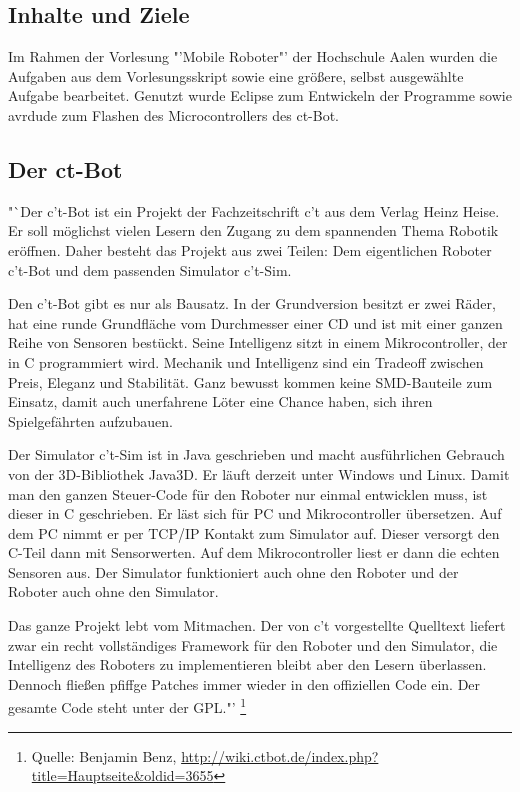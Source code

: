 \subsection{Inhalte und Ziele}
Im Rahmen der Vorlesung "'Mobile Roboter"' der Hochschule Aalen wurden die Aufgaben aus dem Vorlesungsskript sowie eine größere, selbst ausgewählte Aufgabe bearbeitet.
Genutzt wurde Eclipse zum Entwickeln der Programme sowie avrdude zum Flashen des Microcontrollers des ct-Bot.

\subsection{Der ct-Bot}
"`Der c't-Bot ist ein Projekt der Fachzeitschrift c't aus dem Verlag Heinz Heise.
Er soll möglichst vielen Lesern den Zugang zu dem spannenden Thema Robotik eröffnen.
Daher besteht das Projekt aus zwei Teilen: Dem eigentlichen Roboter c't-Bot und dem passenden Simulator c't-Sim.

Den c't-Bot gibt es nur als Bausatz. In der Grundversion besitzt er zwei Räder,
hat eine runde Grundfläche vom Durchmesser einer CD und ist mit einer ganzen Reihe von Sensoren
bestückt. Seine Intelligenz sitzt in einem Mikrocontroller, der in C programmiert wird. Mechanik
und Intelligenz sind ein Tradeoff zwischen Preis, Eleganz und Stabilität. Ganz bewusst kommen keine
SMD-Bauteile zum Einsatz, damit auch unerfahrene Löter eine Chance haben,
sich ihren Spielgefährten aufzubauen.

Der Simulator c't-Sim ist in Java geschrieben und macht ausführlichen Gebrauch von der
3D-Bibliothek Java3D. Er läuft derzeit unter Windows und Linux. Damit man den ganzen Steuer-Code
für den Roboter nur einmal entwicklen muss, ist dieser in C geschrieben. Er läst sich für PC und Mikrocontroller
übersetzen. Auf dem PC nimmt er per TCP/IP Kontakt zum Simulator auf. Dieser versorgt den C-Teil dann mit Sensorwerten.
Auf dem Mikrocontroller liest er dann die echten Sensoren aus. Der Simulator funktioniert auch
ohne den Roboter und der Roboter auch ohne den Simulator.

Das ganze Projekt lebt vom Mitmachen. Der von c't vorgestellte Quelltext liefert zwar ein recht
vollständiges Framework für den Roboter und den Simulator, die Intelligenz des Roboters zu
implementieren bleibt aber den Lesern überlassen. Dennoch fließen pfiffge Patches immer wieder in
den offiziellen Code ein. Der gesamte Code steht unter der GPL."'
\footnote{Quelle: Benjamin Benz, \url{http://wiki.ctbot.de/index.php?title=Hauptseite&oldid=3655}}




